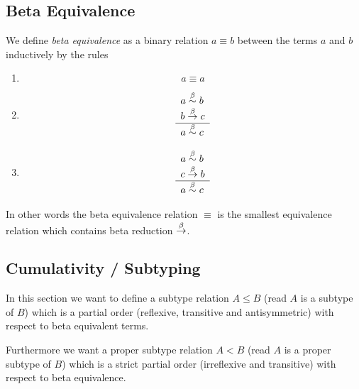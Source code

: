 \subsection{Beta Equivalence}


\begin{definition}
    We define \emph{beta equivalence} as a binary relation $a \equiv b$ between
    the terms $a$ and $b$ inductively by the rules
    \begin{enumerate}
    \item
        $$ a \equiv a$$

    \item
        $$
        \begin{array}{l} 
            a \stackrel{\beta}{\sim} b
            \\
            b \stackrel{\beta}{\to} c
         \\ \hline 
            a \stackrel{\beta}{\sim} c
        \end{array}
        $$

    \item
        $$
        \begin{array}{l} 
            a \stackrel{\beta}{\sim} b
            \\
            c \stackrel{\beta}{\to} b
         \\ \hline 
            a \stackrel{\beta}{\sim} c
        \end{array}
        $$
    \end{enumerate}

    In other words the beta equivalence relation $\equiv$ is the smallest
    equivalence relation which contains beta reduction $\stackrel{\beta}{\to}$.
\end{definition}













\subsection{Cumulativity / Subtyping}

In this section we want to define a subtype relation $A \le B$ (read $A$ is a
subtype of $B$) which is a partial order (reflexive, transitive and
antisymmetric) with respect to beta equivalent terms.

Furthermore we want a proper subtype relation $A < B$ (read $A$ is a proper
subtype of $B$) which is a strict partial order (irreflexive and transitive)
with respect to beta equivalence.

